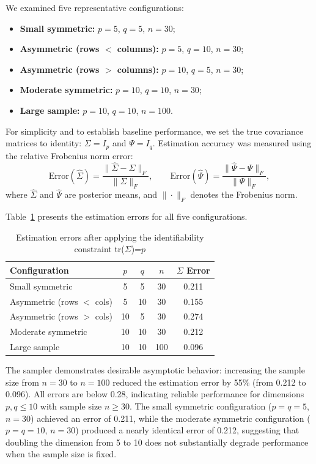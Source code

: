 \documentclass[twoside]{article}
\begin{document}
\noindent We examined five representative configurations:
\begin{itemize}
    \item \textbf{Small symmetric:} $p=5$, $q=5$, $n=30$;
    \item \textbf{Asymmetric (rows $<$ columns):} $p=5$, $q=10$, $n=30$;
    \item \textbf{Asymmetric (rows $>$ columns):} $p=10$, $q=5$, $n=30$;
    \item \textbf{Moderate symmetric:} $p=10$, $q=10$, $n=30$;
    \item \textbf{Large sample:} $p=10$, $q=10$, $n=100$.
\end{itemize}

\noindent For simplicity and to establish baseline performance, we set the true covariance matrices to identity: $\Sigma = I_p$ and $\Psi = I_q$. Estimation accuracy was measured using the relative Frobenius norm error:
\begin{equation*}
\text{Error}(\hat{\Sigma}) = \frac{\|\hat{\Sigma} - \Sigma\|_F}{\|\Sigma\|_F}, \qquad
\text{Error}(\hat{\Psi}) = \frac{\|\hat{\Psi} - \Psi\|_F}{\|\Psi\|_F},
\end{equation*}
where $\hat{\Sigma}$ and $\hat{\Psi}$ are posterior means, and $\|\cdot\|_F$ denotes the Frobenius norm.

\noindent  Table~\ref{tab:corrected} presents the estimation errors for all five configurations.

\begin{table}[h]
\centering
\caption{Estimation errors after applying the identifiability constraint tr($\Sigma$)=$p$}
\label{tab:corrected}
\begin{tabular}{lcccc}
\hline
\textbf{Configuration} & \textbf{$p$} & \textbf{$q$} & \textbf{$n$} & \textbf{$\Sigma$ Error} \\
\hline
Small symmetric & 5 & 5 & 30 & 0.211 \\
Asymmetric (rows $<$ cols) & 5 & 10 & 30 & 0.155 \\
Asymmetric (rows $>$ cols) & 10 & 5 & 30 & 0.274 \\
Moderate symmetric & 10 & 10 & 30 & 0.212 \\
Large sample & 10 & 10 & 100 & 0.096 \\
\hline
\end{tabular}
\end{table}

\noindent  The sampler demonstrates desirable asymptotic behavior: increasing the sample size from $n=30$ to $n=100$ reduced the estimation error by 55\% (from 0.212 to 0.096). All errors are below 0.28, indicating reliable performance for dimensions $p,q \leq 10$ with sample size $n \geq 30$. The small symmetric configuration ($p=q=5$, $n=30$) achieved an error of 0.211, while the moderate symmetric configuration ($p=q=10$, $n=30$) produced a nearly identical error of 0.212, suggesting that doubling the dimension from 5 to 10 does not substantially degrade performance when the sample size is fixed.
\end{document}
